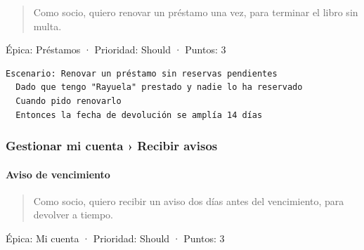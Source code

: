 \documentclass[11pt,a4paper]{article}
\begin{document}
\begin{quote}
Como socio, quiero renovar un préstamo una vez, para terminar el libro sin multa.
\end{quote}

Épica: Préstamos · Prioridad: Should · Puntos: 3

\begin{Verbatim}[breaklines,fontsize=\small,frame=single,framerule=0.4pt,rulecolor=\color{black!25}]
Escenario: Renovar un préstamo sin reservas pendientes
  Dado que tengo "Rayuela" prestado y nadie lo ha reservado
  Cuando pido renovarlo
  Entonces la fecha de devolución se amplía 14 días
\end{Verbatim}

\subsubsection*{Gestionar mi cuenta › Recibir avisos}

\paragraph*{Aviso de vencimiento}

\begin{quote}
Como socio, quiero recibir un aviso dos días antes del vencimiento, para devolver a tiempo.
\end{quote}

Épica: Mi cuenta · Prioridad: Should · Puntos: 3
\end{document}
